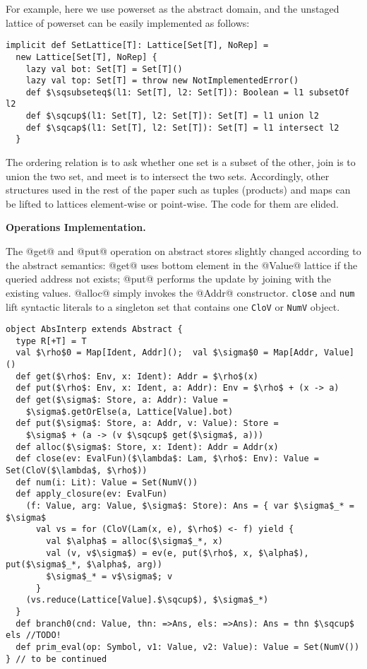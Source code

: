 For example, here we use powerset as the abstract domain, and the unstaged lattice 
of powerset can be easily implemented as follows:

\begin{lstlisting}
implicit def SetLattice[T]: Lattice[Set[T], NoRep] = 
  new Lattice[Set[T], NoRep] {
    lazy val bot: Set[T] = Set[T]()
    lazy val top: Set[T] = throw new NotImplementedError()
    def $\sqsubseteq$(l1: Set[T], l2: Set[T]): Boolean = l1 subsetOf l2
    def $\sqcup$(l1: Set[T], l2: Set[T]): Set[T] = l1 union l2
    def $\sqcap$(l1: Set[T], l2: Set[T]): Set[T] = l1 intersect l2
  }
\end{lstlisting}

The ordering relation is to ask whether one set is a subset of the other, 
join is to union the two set, and meet is to intersect the two sets.
Accordingly, other structures used in the rest of the paper such as tuples 
(products) and maps can be lifted to lattices element-wise or point-wise.
The code for them are elided.

\textbf{Operations Implementation.}

The @get@ and @put@ operation on abstract stores slightly changed according to
the abstract semantics: @get@ uses bottom element in the @Value@ lattice if the queried
address not exists; @put@ performs the update by joining with the existing values.
@alloc@ simply invokes the @Addr@ constructor.
\texttt{close} and \texttt{num} lift syntactic literals to a singleton set that
contains one \texttt{CloV} or \texttt{NumV} object.

\begin{lstlisting}
object AbsInterp extends Abstract {
  type R[+T] = T
  val $\rho$0 = Map[Ident, Addr]();  val $\sigma$0 = Map[Addr, Value]()
  def get($\rho$: Env, x: Ident): Addr = $\rho$(x)
  def put($\rho$: Env, x: Ident, a: Addr): Env = $\rho$ + (x -> a)
  def get($\sigma$: Store, a: Addr): Value = 
    $\sigma$.getOrElse(a, Lattice[Value].bot)
  def put($\sigma$: Store, a: Addr, v: Value): Store =
    $\sigma$ + (a -> (v $\sqcup$ get($\sigma$, a)))
  def alloc($\sigma$: Store, x: Ident): Addr = Addr(x)
  def close(ev: EvalFun)($\lambda$: Lam, $\rho$: Env): Value = Set(CloV($\lambda$, $\rho$))
  def num(i: Lit): Value = Set(NumV())
  def apply_closure(ev: EvalFun)
    (f: Value, arg: Value, $\sigma$: Store): Ans = { var $\sigma$_* = $\sigma$
      val vs = for (CloV(Lam(x, e), $\rho$) <- f) yield {
        val $\alpha$ = alloc($\sigma$_*, x)
        val (v, v$\sigma$) = ev(e, put($\rho$, x, $\alpha$), put($\sigma$_*, $\alpha$, arg))
        $\sigma$_* = v$\sigma$; v
      }
    (vs.reduce(Lattice[Value].$\sqcup$), $\sigma$_*)
  }
  def branch0(cnd: Value, thn: =>Ans, els: =>Ans): Ans = thn $\sqcup$ els //TODO!
  def prim_eval(op: Symbol, v1: Value, v2: Value): Value = Set(NumV())
} // to be continued
\end{lstlisting}

